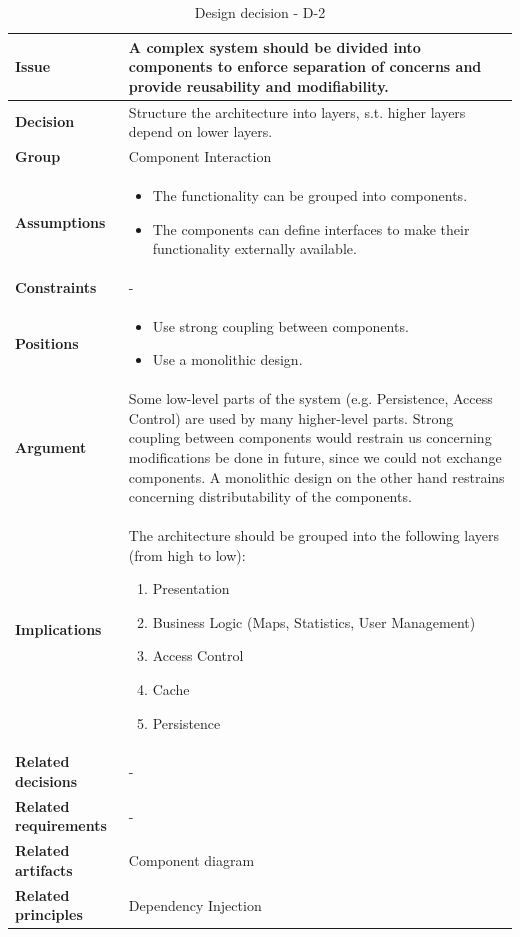 \documentclass[11pt]{article}
\begin{document}
\begin{table}[h] \small
	\begin{tabularx}{\textwidth}{ | l | X |}
    	\hline
	\cellcolor[gray]{0.9}
    	\textbf{Issue} & A complex system should be divided into components to enforce separation of concerns and provide reusability and modifiability. \\
	\hline
	\cellcolor[gray]{0.9}
	\textbf{Decision} & Structure the architecture into layers, s.t. higher layers depend on lower layers. \\ 
	\hline
	\cellcolor[gray]{0.9}
	\textbf{Group} & Component Interaction \\ 
	\hline
	\cellcolor[gray]{0.9}
	\textbf{Assumptions} & 
		\begin{itemize}
		\item The functionality can be grouped into components.
		\item The components can define interfaces to make their functionality externally available.
		\end{itemize}\\ 
	\hline
	\cellcolor[gray]{0.9}
	\textbf{Constraints} & - \\ 
	\hline
	\cellcolor[gray]{0.9}
	\textbf{Positions} & 
		\begin{itemize}
		\item Use strong coupling between components.
		\item Use a monolithic design.
		\end{itemize}\\ 
	\hline
	\cellcolor[gray]{0.9}
	\textbf{Argument} & Some low-level parts of the system (e.g. Persistence, Access Control) are used by many higher-level parts. Strong coupling between components would restrain us concerning modifications be done in future, since we could not exchange components. A monolithic design on the other hand restrains concerning distributability of the components. \\ 
	\hline
	\cellcolor[gray]{0.9}
	\textbf{Implications} & The architecture should be grouped into the following layers (from high to low):
		\begin{enumerate}
		\item Presentation
		\item Business Logic (Maps, Statistics, User Management)
		\item Access Control
		\item Cache
		\item Persistence 
		\end{enumerate}\\ 
	\hline
	\cellcolor[gray]{0.9}
	\textbf{Related decisions} & - \\ 
	\hline
	\cellcolor[gray]{0.9}
	\textbf{Related requirements} & -\\
	\hline
	\cellcolor[gray]{0.9}
	\textbf{Related artifacts} & Component diagram\\
	\hline
	\cellcolor[gray]{0.9}
	\textbf{Related principles} & Dependency Injection\\
	\hline
	\end{tabularx}
	\caption{Design decision - D-2}
	\label{dec:D2}
\end{table}
\end{document}
